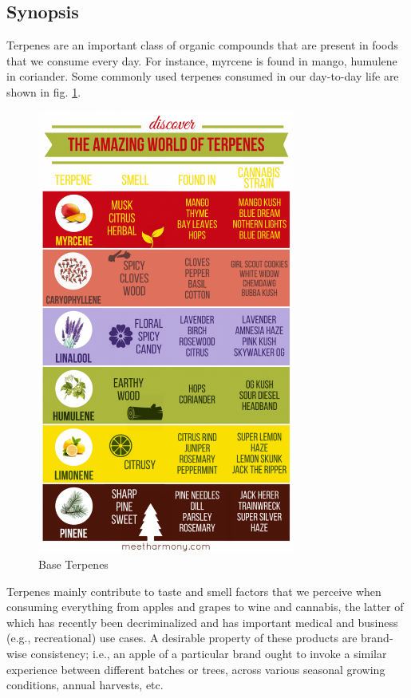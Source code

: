 \documentclass[12pt, a4paper]{article}
\begin{document}
\subsection{Synopsis}
Terpenes are an important class of organic compounds that are present in foods that we consume every day. For instance, myrcene is found in mango, humulene in coriander. Some commonly used terpenes consumed in our day-to-day life are shown in fig. \ref{fig:baseterpenes}. \begin{figure}[!ht]
\centering
    \begin{center}
        \includegraphics[width = 8.5cm]{Terpenes.png}
    \end{center}
    \caption{Base Terpenes \cite{alana2019}}
    \label{fig:baseterpenes}%
\end{figure} Terpenes mainly contribute to taste and smell factors that we perceive when consuming everything from apples and grapes to wine and cannabis, the latter of which has recently been decriminalized and has important medical and business (e.g., recreational) use cases. A desirable property of these products are brand-wise consistency; i.e., an apple of a particular brand ought to invoke a similar experience between different batches or trees, across various seasonal growing conditions, annual harvests, etc.  
\end{document}

